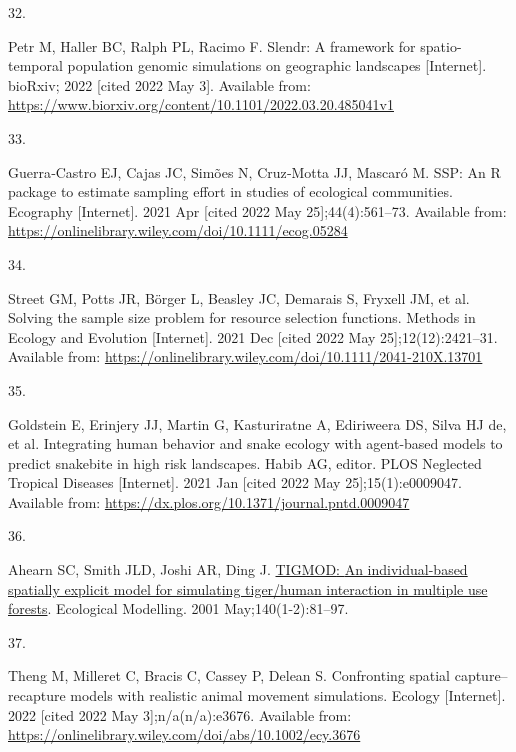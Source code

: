 \documentclass[10pt,a4paper]{article}
\newlength{\cslhangindent}
\newlength{\csllabelwidth}
\newlength{\cslentryspacingunit} %
\newenvironment{CSLReferences}[2] %
 {%
  \setlength{\parindent}{0pt}
  \ifodd #1
  \let\oldpar\par
  \def\par{\hangindent=\cslhangindent\oldpar}
  \fi
  \setlength{\parskip}{#2\cslentryspacingunit}
 }%
 {}
\newcommand{\CSLLeftMargin}[1]{\parbox[t]{\csllabelwidth}{#1}}
\newcommand{\CSLRightInline}[1]{\parbox[t]{\linewidth - \csllabelwidth}{#1}\break}
\begin{document}
\begin{CSLReferences}{0}{0}
\leavevmode{}%
\CSLLeftMargin{32. }
\CSLRightInline{Petr M, Haller BC, Ralph PL, Racimo F. Slendr: A framework for spatio-temporal population genomic simulations on geographic landscapes {[}Internet{]}. bioRxiv; 2022 {[}cited 2022 May 3{]}. Available from: \url{https://www.biorxiv.org/content/10.1101/2022.03.20.485041v1}}

\leavevmode{}%
\CSLLeftMargin{33. }
\CSLRightInline{Guerra‐Castro EJ, Cajas JC, Simões N, Cruz‐Motta JJ, Mascaró M. {SSP}: An {R} package to estimate sampling effort in studies of ecological communities. Ecography {[}Internet{]}. 2021 Apr {[}cited 2022 May 25{]};44(4):561--73. Available from: \url{https://onlinelibrary.wiley.com/doi/10.1111/ecog.05284}}

\leavevmode{}%
\CSLLeftMargin{34. }
\CSLRightInline{Street GM, Potts JR, Börger L, Beasley JC, Demarais S, Fryxell JM, et al. Solving the sample size problem for resource selection functions. Methods in Ecology and Evolution {[}Internet{]}. 2021 Dec {[}cited 2022 May 25{]};12(12):2421--31. Available from: \url{https://onlinelibrary.wiley.com/doi/10.1111/2041-210X.13701}}

\leavevmode{}%
\CSLLeftMargin{35. }
\CSLRightInline{Goldstein E, Erinjery JJ, Martin G, Kasturiratne A, Ediriweera DS, Silva HJ de, et al. Integrating human behavior and snake ecology with agent-based models to predict snakebite in high risk landscapes. Habib AG, editor. PLOS Neglected Tropical Diseases {[}Internet{]}. 2021 Jan {[}cited 2022 May 25{]};15(1):e0009047. Available from: \url{https://dx.plos.org/10.1371/journal.pntd.0009047}}

\leavevmode{}%
\CSLLeftMargin{36. }
\CSLRightInline{Ahearn SC, Smith JLD, Joshi AR, Ding J. \href{https://doi.org/10.1016/S0304-3800(01)00258-7}{{TIGMOD}: {An} individual-based spatially explicit model for simulating tiger/human interaction in multiple use forests}. Ecological Modelling. 2001 May;140(1-2):81--97. }

\leavevmode{}%
\CSLLeftMargin{37. }
\CSLRightInline{Theng M, Milleret C, Bracis C, Cassey P, Delean S. Confronting spatial capture--recapture models with realistic animal movement simulations. Ecology {[}Internet{]}. 2022 {[}cited 2022 May 3{]};n/a(n/a):e3676. Available from: \url{https://onlinelibrary.wiley.com/doi/abs/10.1002/ecy.3676}}


\end{CSLReferences}
\end{document}

